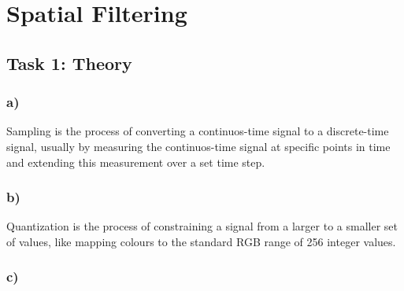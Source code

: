 \section{Spatial Filtering}

\subsection{Task 1: Theory}
\subsubsection*{a)}
Sampling is the process of converting a continuos-time signal to a discrete-time signal, usually by measuring the continuos-time signal at specific points in time and extending this measurement over a set time step. 

\subsubsection*{b)}
Quantization is the process of constraining a signal from a larger to a smaller set of values, like mapping colours to the standard RGB range of 256 integer values. 

\subsubsection*{c)}

